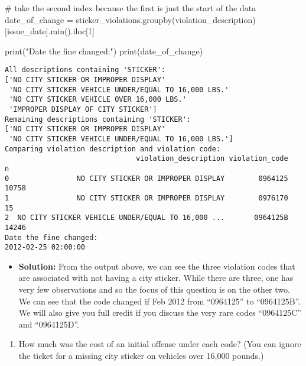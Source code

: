 \documentclass[
  letterpaper,
  DIV=11,
  numbers=noendperiod]{scrartcl}
\newenvironment{Shaded}{\begin{snugshade}}{\end{snugshade}}
\newcommand{\BuiltInTok}[1]{\textcolor[rgb]{0.00,0.23,0.31}{#1}}
\newcommand{\CommentTok}[1]{\textcolor[rgb]{0.37,0.37,0.37}{#1}}
\newcommand{\DecValTok}[1]{\textcolor[rgb]{0.68,0.00,0.00}{#1}}
\newcommand{\NormalTok}[1]{\textcolor[rgb]{0.00,0.23,0.31}{#1}}
\newcommand{\OperatorTok}[1]{\textcolor[rgb]{0.37,0.37,0.37}{#1}}
\newcommand{\StringTok}[1]{\textcolor[rgb]{0.13,0.47,0.30}{#1}}
\providecommand{\tightlist}{%
  \setlength{\itemsep}{0pt}\setlength{\parskip}{0pt}}\usepackage{longtable,booktabs,array}
\begin{document}
\begin{Shaded}
\begin{Highlighting}[]
\CommentTok{\# take the second index because the first is just the start of the data}
\NormalTok{date\_of\_change }\OperatorTok{=}\NormalTok{ sticker\_violations.groupby(}\StringTok{\textquotesingle{}violation\_description\textquotesingle{}}\NormalTok{)[}\StringTok{\textquotesingle{}issue\_date\textquotesingle{}}\NormalTok{].}\BuiltInTok{min}\NormalTok{().iloc[}\DecValTok{1}\NormalTok{]}

\BuiltInTok{print}\NormalTok{(}\StringTok{"Date the fine changed:"}\NormalTok{)}
\BuiltInTok{print}\NormalTok{(date\_of\_change)}
\end{Highlighting}
\end{Shaded}

\begin{verbatim}
All descriptions containing 'STICKER':
['NO CITY STICKER OR IMPROPER DISPLAY'
 'NO CITY STICKER VEHICLE UNDER/EQUAL TO 16,000 LBS.'
 'NO CITY STICKER VEHICLE OVER 16,000 LBS.'
 'IMPROPER DISPLAY OF CITY STICKER']
Remaining descriptions containing 'STICKER':
['NO CITY STICKER OR IMPROPER DISPLAY'
 'NO CITY STICKER VEHICLE UNDER/EQUAL TO 16,000 LBS.']
Comparing violation description and violation code:
                               violation_description violation_code      n
0                NO CITY STICKER OR IMPROPER DISPLAY        0964125  10758
1                NO CITY STICKER OR IMPROPER DISPLAY        0976170     15
2  NO CITY STICKER VEHICLE UNDER/EQUAL TO 16,000 ...       0964125B  14246
Date the fine changed:
2012-02-25 02:00:00
\end{verbatim}

\begin{itemize}
\tightlist
\item
  \textbf{Solution:} From the output above, we can see the three
  violation codes that are associated with not having a city sticker.
  While there are three, one has very few observations and so the focus
  of this question is on the other two. We can see that the code changed
  if Feb 2012 from ``0964125'' to ``0964125B''. We will also give you
  full credit if you discuss the very rare codes ``0964125C'' and
  ``0964125D''.
\end{itemize}

\begin{enumerate}
\def\labelenumi{\arabic{enumi}.}
\setcounter{enumi}{3}
\tightlist
\item
  How much was the cost of an initial offense under each code? (You can
  ignore the ticket for a missing city sticker on vehicles over 16,000
  pounds.)
\end{enumerate}
\end{document}
